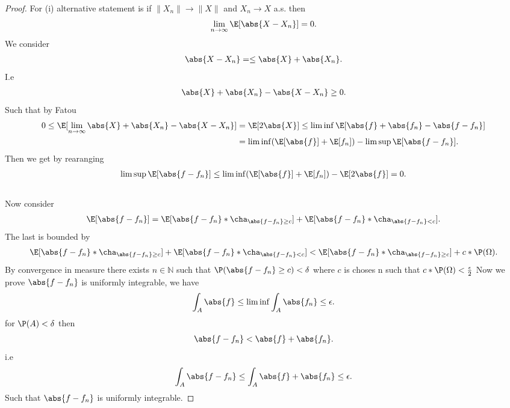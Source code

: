 \begin{proof}
  For (i)  alternative statement is if $\|X_n\| \to  \|X\|$ and $X_n \to X$  a.s. then
  \begin{align*}
    \lim_{n \to \infty} \E[\abs{X - X_n}]  = 0
  .\end{align*}
  We consider 
  \begin{align*}
    \abs{X-X_n} = \le  \abs{X} + \abs{X_n}
  .\end{align*}
 I.e 
 \begin{align*}
  \abs{X} + \abs{X_n} - \abs{X-X_n} \ge 0
 .\end{align*}
 Such that  by Fatou 
 \begin{align*}
   0 \le \E[\lim_{n\to \infty} \abs{X} + \abs{X_n} - \abs{X-X_n}]  &=   \E[2 \abs{X}] \le  \liminf \E[\abs{f} + \abs{f_n} - \abs{f-f_n}]\\
                                                                   &= \liminf (\E[\abs{f}] + \E[f_n]) - \limsup \E[\abs{f-f_n}]
 .\end{align*}
 Then we get by rearanging
 \begin{align*}
   \limsup \E[\abs{f-f_n}] \le  \liminf (\E[\abs{f}] + \E[f_n]) - \E[2\abs{f}]  = 0
 .\end{align*}
 \\[1ex]
 Now consider 
 \begin{align*}
   \E[\abs{f-f_n}] = \E[\abs{f-f_n}*\cha_{\abs{f-f_n}\ge c}] +  \E[\abs{f-f_n}*\cha_{\abs{f-f_n}  < c}]
 .\end{align*}
 The last is bounded by 
 \begin{align*}
   \E[\abs{f-f_n}*\cha_{\abs{f-f_n}\ge c}] +  \E[\abs{f-f_n}*\cha_{\abs{f-f_n}  < c}] <  \E[\abs{f-f_n}*\cha_{\abs{f-f_n}\ge c}] + c*\P(\Omega)
 .\end{align*}
 By convergence in measure there exists $n \in  \mathbb{N}$ such that $\P(\abs{f-f_n} \ge c)<\delta $ where $c$ is choses n such that $c*\P(\Omega ) < \frac{\epsilon}{2} $ 
 Now we prove $\abs{f-f_n}$ is uniformly integrable, we have 
 \begin{align*}
  \int_A \abs{f} \le \liminf \int_A \abs{f_n} \le  \epsilon
 .\end{align*}
 for $\P(A) < \delta $ then 
 \begin{align*}
  \abs{f-f_n} < \abs{f} + \abs{f_n}
 .\end{align*}
 i.e 
 \begin{align*}
  \int_A \abs{f-f_n} \le  \int_A \abs{f} + \abs{f_n} \le  \epsilon
 .\end{align*}
 Such that $\abs{f-f_n}$ is uniformly integrable.
\end{proof}
